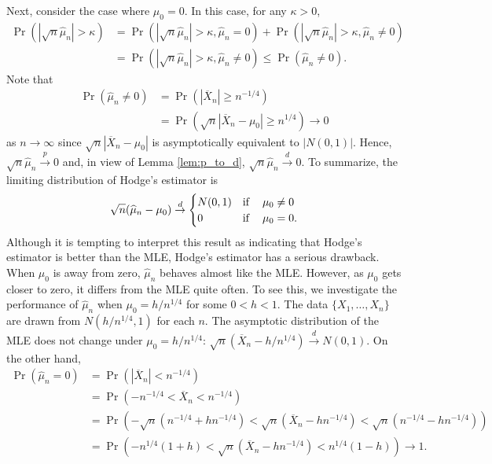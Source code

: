 \documentclass[10.5pt, A4paper, openany, uplatex]{book}
\renewcommand{\hat}{\widehat}
\renewcommand{\bar}{\overline}
\numberwithin{equation}{section}
\begin{document}
Next, consider the case where $\mu_0 = 0$.
In this case, for any $\kappa > 0$,
\begin{align*}
	\Pr\left(\left| \sqrt{n} \hat \mu_n \right| > \kappa \right) 
	& = \Pr\left(\left| \sqrt{n}\hat \mu_n \right| > \kappa, \hat \mu_n = 0\right) + \Pr\left( \left| \sqrt{n} \hat \mu_n \right| > \kappa, \hat \mu_n \neq 0\right) \\
	& = \Pr(\left| \sqrt{n} \hat \mu_n \right| > \kappa, \hat \mu_n \neq 0)  \le \Pr( \hat \mu_n \neq 0). 
\end{align*}
Note that
\begin{align*}
	\Pr( \hat \mu_n \neq 0) 
	& = \Pr(|\bar X_n| \ge n^{-1/4}) \\
	& = \Pr(\sqrt{n}|\bar X_n - \mu_0| \ge n^{1/4}) \to 0
\end{align*}
as $n \to \infty$ since $\sqrt{n}|\bar X_n - \mu_0|$ is asymptotically equivalent to $|N(0,1)|$.
Hence, $\sqrt{n}\hat \mu_n \overset{p}{\to} 0$ and, in view of Lemma \ref{lem:p_to_d}, $\sqrt{n}\hat \mu_n \overset{d}{\to} 0$.
To summarize, the limiting distribution of Hodge's estimator is
\begin{align*}
	\sqrt{n}(\hat \mu_n - \mu_0) \overset{d}{\to} \begin{cases}
		N(0,1) & \text{if \;\; $\mu_0 \neq 0$}\\
		0      & \text{if \;\; $\mu_0 = 0$}.
	\end{cases}
\end{align*}
Although it is tempting to interpret this result as indicating that Hodge's estimator is better than the MLE, Hodge's estimator has a serious drawback.
When $\mu_0$ is away from zero, $\hat \mu_n$ behaves almost like the MLE.
However, as $\mu_0$ gets closer to zero, it differs from the MLE quite often.
To see this, we investigate the performance of $\hat \mu_n$ when $\mu_0 = h/n^{1/4}$ for some $0 < h < 1$.
The data $\{X_1, \ldots, X_n\}$ are drawn from $N(h/n^{1/4}, 1)$ for each $n$.
The asymptotic distribution of the MLE does not change under $\mu_0 = h/n^{1/4}$: $\sqrt{n}(\bar X_n - h/n^{1/4}) \overset{d}{\to} N(0,1)$.
On the other hand,
\begin{align*}
	\Pr(\hat \mu_n = 0)
	& = \Pr(|\bar X_n| < n^{-1/4}) \\
	& = \Pr(- n^{-1/4} < \bar X_n < n^{-1/4}) \\
	& = \Pr \left(- \sqrt{n}(n^{-1/4} + h n^{-1/4}) < \sqrt{n}(\bar X_n - h n^{-1/4}) < \sqrt{n}(n^{-1/4} - h n^{-1/4}) \right) \\
	& = \Pr\left(-n^{1/4}(1 + h) < \sqrt{n}(\bar X_n - h n^{-1/4}) < n^{1/4}(1 - h)\right) \to 1.
\end{align*}
\end{document}
